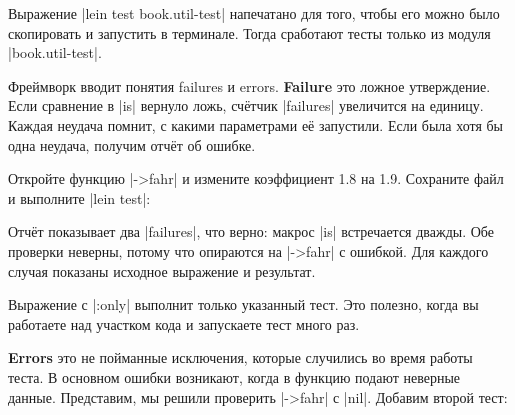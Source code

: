 
Выражение \spverb|lein test book.util-test| напечатано для того, чтобы его можно
было скопировать и запустить в терминале. Тогда сработают тесты только из модуля
\spverb|book.util-test|.

Фреймворк вводит понятия failures и errors. \textbf{Failure}  это
ложное утверждение. Если сравнение в \spverb|is| вернуло ложь, счётчик
\spverb|failures| увеличится на единицу. Каждая неудача помнит, с какими
параметрами её запустили. Если была хотя бы одна неудача, получим отчёт об
ошибке.

Откройте функцию \spverb|->fahr| и измените коэффициент 1.8 на 1.9. Сохраните
файл и выполните \spverb|lein test|:

\begin{english}
\end{english}

Отчёт показывает два \spverb|failures|, что верно: макрос \spverb|is|
встречается дважды. Обе проверки неверны, потому что опираются на
\spverb|->fahr| с ошибкой. Для каждого случая показаны исходное выражение и
результат.

Выражение с \spverb|:only| выполнит только указанный тест. Это полезно, когда вы
работаете над участком кода и запускаете тест много раз.

\begin{english}
\end{english}


\textbf{Errors} это не пойманные исключения, которые случились во время работы
теста. В основном ошибки возникают, когда в функцию подают неверные
данные. Представим, мы решили проверить \spverb|->fahr| с \spverb|nil|. Добавим
второй тест:

